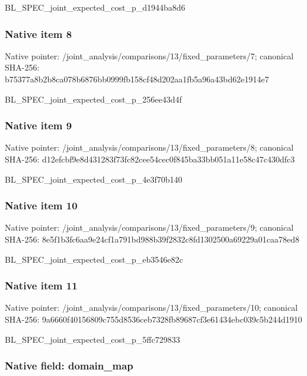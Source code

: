 \documentclass[10pt,a4paper]{article}
\begin{document}
BL\_SPEC\_joint\_expected\_c\allowbreak{}ost\_p\_d1944ba8d6


\subsubsection{Native item 8}


Native pointer: /joint\_analysis/comparis\allowbreak{}ons/13/fixed\_parameters/\allowbreak{}7; canonical SHA-256: b75377a8b2b8ca078b6876bb\allowbreak{}0999fb158cf48d202aa1fb5a\allowbreak{}96a43bd62e1914e7


BL\_SPEC\_joint\_expected\_c\allowbreak{}ost\_p\_256ee43d4f


\subsubsection{Native item 9}


Native pointer: /joint\_analysis/comparis\allowbreak{}ons/13/fixed\_parameters/\allowbreak{}8; canonical SHA-256: d12efcbf9e8d431283f73fc8\allowbreak{}2cee54cec0f845ba33bb051a\allowbreak{}11e58c47c430dfc3


BL\_SPEC\_joint\_expected\_c\allowbreak{}ost\_p\_4e3f70b140


\subsubsection{Native item 10}


Native pointer: /joint\_analysis/comparis\allowbreak{}ons/13/fixed\_parameters/\allowbreak{}9; canonical SHA-256: 8e5f1b3fc6aa9e24cf1a791b\allowbreak{}d988b39f2832c8fd1302500a\allowbreak{}69229a01caa78ed8


BL\_SPEC\_joint\_expected\_c\allowbreak{}ost\_p\_eb3546e82c


\subsubsection{Native item 11}


Native pointer: /joint\_analysis/comparis\allowbreak{}ons/13/fixed\_parameters/\allowbreak{}10; canonical SHA-256: 9a6660f40156809c755d8536\allowbreak{}ceb7328fb89687cf3e61434e\allowbreak{}bc039c5b244d1910


BL\_SPEC\_joint\_expected\_c\allowbreak{}ost\_p\_5ffc729833


\subsubsection{Native field: domain\_map}
\end{document}
